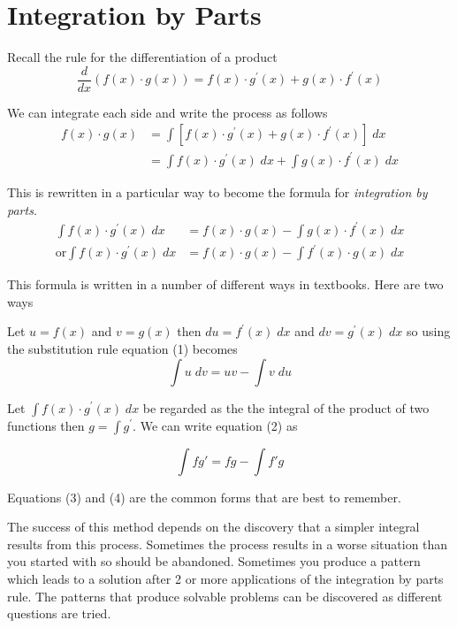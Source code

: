\section{Integration by Parts}
Recall the rule for the differentiation of a product
\begin{equation*}\frac{d}{d x} \left (f (x) \cdot g (x)\right ) =f (x) \cdot g^{ \prime } (x) +g (x) \cdot f^{ \prime } (x)
\end{equation*}

We can integrate each side and write the process as follows
\begin{align*}f (x) \cdot g (x) &  = \int \left [f (x) \cdot g^{ \prime } (x) +g (x) \cdot f^{ \prime } (x)\right ]\; d x \\
 &  = \int f (x) \cdot g^{ \prime } (x)\; d x +\int g (x) \cdot f^{ \prime } (x)\; d x\end{align*}

This is rewritten in a particular way to become the formula for \emph{integration by parts}.
\begin{align}\int f (x) \cdot g^{ \prime } (x)\; d x &  = f (x) \cdot g (x) -\int g (x) \cdot f^{ \prime } (x)\; d x \tag{1} \\
\text{or}\int f (x) \cdot g^{ \prime } (x)\; d x &  = f (x) \cdot g (x) -\int f^{ \prime } (x) \cdot g (x)\; d x \tag{2}\end{align}

This formula is written in a number of different ways in textbooks. Here
are two ways 

Let $u =f (x)$ and $v =g (x)$ then $d u =f^{ \prime } (x)\; d x$ and $d v =g^{ \prime } (x)\; d x$ so using the substitution rule equation (1) becomes
\begin{equation}\int u\; d v =u v -\int v\; d u\tag{3}
\end{equation}

Let $\int f (x) \cdot g^{ \prime } (x)\; d x$ be regarded as the the integral of the product of two functions then $g =\int g^{ \prime }$. We can write equation (2) as
\begin{tcolorbox}
	\[\int fg'=fg-\int f'g \tag{4}\]
\end{tcolorbox}
Equations (3) and (4) are the common forms that are best to remember.

The success of this method depends on the discovery that a simpler integral results from this process. Sometimes the process results in a worse situation than you started with so should be abandoned. Sometimes you produce a pattern which leads to a solution after 2 or more applications of the integration by parts rule. The patterns that produce solvable problems can be discovered as different questions are tried. 

